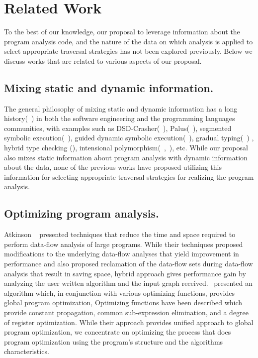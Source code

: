 \chapter{Related Work}
\label{sec:related}

To the best of our knowledge, our proposal to leverage information about the
program analysis code, and the nature of the data on which analysis is applied
to select appropriate traversal strategies has not been explored previously.
Below we discuss works that are related to various aspects of our proposal. 

\section{Mixing static and dynamic information.} %
The general philosophy of mixing static and dynamic information has a long 
history(~\cite{Ernst2003}) in both the software engineering and the programming 
languages communities, with examples such as DSD-Crasher(~\cite{DSD-Crasher}), 
Palus(~\cite{Palus}), segmented symbolic execution(~\cite{Le2013}), guided 
dynamic symbolic execution(~\cite{Christakis2016}), gradual typing(~\cite{Siek07})
, hybrid type checking (\cite{Flanagan06}), intensional polymorphism(~\cite{Harper95},~\cite{ 
crary2002intensional}), etc. While our proposal also mixes static information 
about program analysis with dynamic information about the data, none of the 
previous works have proposed utilizing this information for selecting 
appropriate traversal strategies for realizing the program analysis.

\section{Optimizing program analysis.}%
Atkinson ~\cite{atkinson2001implementation} presented techniques that reduce 
the time and space required to perform data-flow analysis of large programs. 
While their techniques proposed modifications to the underlying data-flow 
analyses that yield improvement in performance and also proposed reclamation 
of the data-flow sets during data-flow analysis that result in saving space, 
hybrid approach gives performance gain by analyzing the user written 
algorithm and the input graph received.\newline ~\cite{kildall1973unified} 
presented an algorithm which, in conjunction with various optimizing 
functions, provides global program optimization, Optimizing functions have 
been described which provide constant propagation, common sub-expression 
elimination, and a degree of register optimization. While their approach 
provides unified approach to global program optimization, we concentrate on 
optimizing the process that does program optimization using the program's 
structure and the algorithms characteristics.

